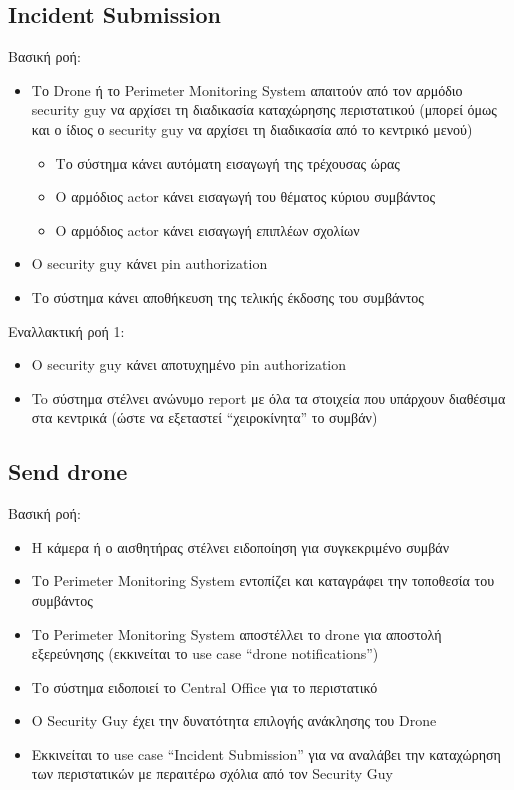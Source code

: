 \documentclass{article}
\begin{document}
\subsection{Incident Submission}

\noindent Βασική ροή:
\begin{itemize}
    \item Το Drone ή το Perimeter Monitoring System απαιτούν από τον αρμόδιο security guy να αρχίσει τη διαδικασία καταχώρησης περιστατικού (μπορεί όμως και ο ίδιος ο security guy να αρχίσει τη διαδικασία από το κεντρικό μενού)
    \begin{itemize}
        \item Το σύστημα κάνει αυτόματη εισαγωγή της τρέχουσας ώρας
        \item Ο αρμόδιος actor κάνει εισαγωγή του θέματος κύριου συμβάντος
        \item Ο αρμόδιος actor κάνει εισαγωγή επιπλέων σχολίων
    \end{itemize}
    \item Ο security guy κάνει pin authorization
    \item Το σύστημα κάνει αποθήκευση της τελικής έκδοσης του συμβάντος
\end{itemize}

\noindent Εναλλακτική ροή 1:
\begin{itemize}
    \item Ο security guy κάνει αποτυχημένο pin authorization
    \item To σύστημα στέλνει ανώνυμο report με όλα τα στοιχεία που υπάρχουν διαθέσιμα στα κεντρικά (ώστε να εξεταστεί “χειροκίνητα” το συμβάν)
\end{itemize}

\subsection{Send drone}
\noindent Βασική ροή:
\begin{itemize}
    \item Η κάμερα ή ο αισθητήρας στέλνει ειδοποίηση για συγκεκριμένο συμβάν
    \item Το Perimeter Monitoring System εντοπίζει και καταγράφει την τοποθεσία του συμβάντος
    \item Το Perimeter Monitoring System αποστέλλει το drone για αποστολή εξερεύνησης (εκκινείται το use case “drone notifications”)
    \item Το σύστημα ειδοποιεί το Central Office για το περιστατικό
    \item Ο Security Guy έχει την δυνατότητα επιλογής ανάκλησης του Drone
    \item Εκκινείται το use case “Incident Submission” για να αναλάβει την καταχώρηση των περιστατικών με περαιτέρω σχόλια από τον Security Guy
\end{itemize}
\end{document}
